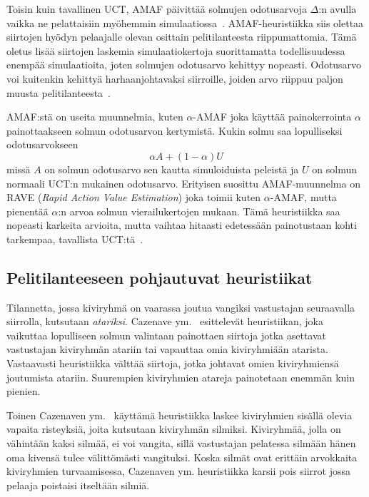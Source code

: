 \documentclass[12pt,finnish]{tktltiki2}
\theoremstyle{definition}
\theoremstyle{remark}
\begin{document}
Toisin kuin tavallinen UCT, AMAF päivittää solmujen odotusarvoja $\Delta$:n avulla vaikka ne pelattaisiin myöhemmin simulaatiossa~\cite{browne, helmbold}. AMAF-heuristiikka siis olettaa siirtojen hyödyn pelaajalle olevan osittain pelitilanteesta riippumattomia. Tämä oletus lisää siirtojen laskemia simulaatiokertoja suorittamatta todellisuudessa enempää simulaatioita, joten solmujen odotusarvo kehittyy nopeasti. Odotusarvo voi kuitenkin kehittyä harhaanjohtavaksi siirroille, joiden arvo riippuu paljon muusta pelitilanteesta~\cite{helmbold}.

AMAF:stä on useita muunnelmia, kuten $\alpha$-AMAF joka käyttää painokerrointa $\alpha$ painottaakseen solmun odotusarvon kertymistä. Kukin solmu saa lopulliseksi odotusarvokseen
\begin{equation}
\alpha A + (1 - \alpha)U
\end{equation}
missä $A$ on solmun odotusarvo sen kautta simuloiduista peleistä ja $U$ on solmun normaali UCT:n mukainen odotusarvo. Erityisen suosittu AMAF-muunnelma on RAVE (\textit{Rapid Action Value Estimation}) joka toimii kuten $\alpha$-AMAF, mutta pienentää $\alpha$:n arvoa solmun vierailukertojen mukaan. Tämä heuristiikka saa nopeasti karkeita arvioita, mutta vaihtaa hitaasti edetessään painotustaan kohti tarkempaa, tavallista UCT:tä~\cite{browne}.

\subsection{Pelitilanteeseen pohjautuvat heuristiikat}

Tilannetta, jossa kiviryhmä on vaarassa joutua vangiksi vastustajan seuraavalla siirrolla, kutsutaan \textit{atariksi}. Cazenave ym.~\cite{cazenaveatari} esittelevät heuristiikan, joka vaikuttaa lopulliseen solmun valintaan painottaen siirtoja jotka asettavat vastustajan kiviryhmän atariin tai vapauttaa omia kiviryhmiään atarista. Vastaavasti heuristiikka välttää siirtoja, jotka johtavat omien kiviryhmiensä joutumista atariin. Suurempien kiviryhmien atareja painotetaan enemmän kuin pienien.

Toinen Cazenaven ym.~\cite{cazenave} käyttämä heuristiikka laskee kiviryhmien sisällä olevia vapaita risteyksiä, joita kutsutaan kiviryhmän silmiksi. Kiviryhmää, jolla on vähintään kaksi silmää, ei voi vangita, sillä vastustajan pelatessa silmään hänen oma kivensä tulee välittömästi vangituksi. Koska silmät ovat erittäin arvokkaita kiviryhmien turvaamisessa, Cazenaven ym. heuristiikka karsii pois siirrot jossa pelaaja poistaisi itseltään silmiä.
\end{document}
